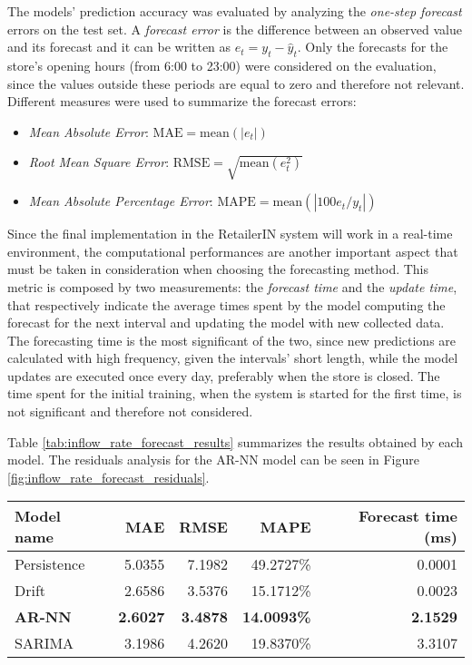 The models’ prediction accuracy was evaluated by analyzing the \emph{one-step forecast} errors on the test set. A \emph{forecast error} is the difference between an observed value and its forecast and it can be written as \( e_t = y_t - \hat{y}_t \). Only the forecasts for the store’s opening hours (from 6:00 to 23:00) were considered on the evaluation, since the values outside these periods are equal to zero and therefore not relevant. Different measures were used to summarize the forecast errors:
\begin{itemize}
  \item \emph{Mean Absolute Error}: \( \text{MAE} = \text{mean}(| e_t |) \)
  \item \emph{Root Mean Square Error}: \( \text{RMSE} = \sqrt{\text{mean}(e_t^2)} \)
  \item \emph{Mean Absolute Percentage Error}: \( \text{MAPE} =  \text{mean}(| 100 e_t / y_t |) \)
\end{itemize}

Since the final implementation in the RetailerIN system will work in a real-time environment, the computational performances are another important aspect that must be taken in consideration when choosing the forecasting method. This metric is composed by two measurements: the \emph{forecast time} and the \emph{update time}, that respectively indicate the average times spent by the model computing the forecast for the next interval and updating the model with new collected data. The forecasting time is the most significant of the two, since new predictions are calculated with high frequency, given the intervals’ short length, while the model updates are executed once every day, preferably when the store is closed. The time spent for the initial training, when the system is started for the first time, is not significant and therefore not considered.

Table \ref{tab:inflow_rate_forecast_results} summarizes the results obtained by each model. The residuals analysis for the AR-NN model can be seen in Figure \ref{fig:inflow_rate_forecast_residuals}.

\begin{center}
  \begin{tabular}{ l r r r r }
    \hline
    Model name     & MAE             & RMSE            & MAPE               & Forecast time (ms) \\
    \hline
    Persistence    & 5.0355          & 7.1982          & 49.2727\%          & 0.0001             \\
    Drift          & 2.6586          & 3.5376          & 15.1712\%          & 0.0023             \\
    \textbf{AR-NN} & \textbf{2.6027} & \textbf{3.4878} & \textbf{14.0093\%} & \textbf{2.1529}    \\
    SARIMA         & 3.1986          & 4.2620          & 19.8370\%          & 3.3107             \\
    \hline
  \end{tabular}
\end{center}

